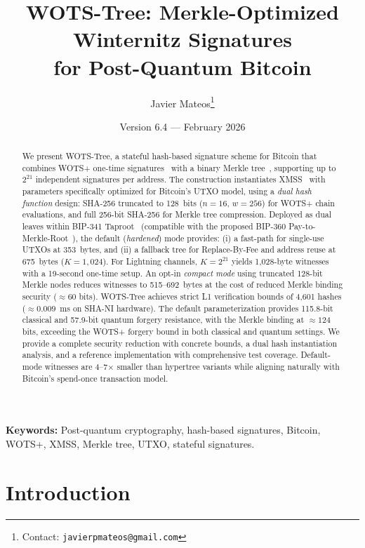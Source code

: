 \documentclass[11pt,a4paper]{article}
\title{\textbf{WOTS-Tree: Merkle-Optimized Winternitz Signatures\\for Post-Quantum Bitcoin}}
\author{Javier Mateos\thanks{Contact: \texttt{javierpmateos@gmail.com}}}
\date{Version 6.4 --- February 2026}
\theoremstyle{definition}
\begin{document}
\maketitle

\begin{abstract}
We present WOTS-Tree, a stateful hash-based signature scheme for Bitcoin that combines WOTS+ one-time signatures~\cite{hulsing2013wots} with a binary Merkle tree~\cite{merkle1989certified}, supporting up to $2^{21}$ independent signatures per address. The construction instantiates XMSS~\cite{buchmann2011xmss,rfc8391} with parameters specifically optimized for Bitcoin's UTXO model, using a \emph{dual hash function} design: SHA-256 truncated to 128~bits ($n=16$, $w=256$) for WOTS+ chain evaluations, and full 256-bit SHA-256 for Merkle tree compression. Deployed as dual leaves within BIP-341 Taproot~\cite{bip341} (compatible with the proposed BIP-360 Pay-to-Merkle-Root~\cite{bip360}), the default (\emph{hardened}) mode provides: (i) a fast-path for single-use UTXOs at 353~bytes, and (ii) a fallback tree for Replace-By-Fee and address reuse at 675~bytes ($K=1{,}024$). For Lightning channels, $K=2^{21}$ yields 1,028-byte witnesses with a 19-second one-time setup. An opt-in \emph{compact mode} using truncated 128-bit Merkle nodes reduces witnesses to 515--692~bytes at the cost of reduced Merkle binding security ($\approx 60$ bits). WOTS-Tree achieves strict L1 verification bounds of 4,601 hashes ($\approx 0.009$~ms on SHA-NI hardware). The default parameterization provides 115.8-bit classical and 57.9-bit quantum forgery resistance, with the Merkle binding at $\approx 124$ bits, exceeding the WOTS+ forgery bound in both classical and quantum settings. We provide a complete security reduction with concrete bounds, a dual hash instantiation analysis, and a reference implementation with comprehensive test coverage. Default-mode witnesses are 4--7$\times$ smaller than hypertree variants while aligning naturally with Bitcoin's spend-once transaction model.
\end{abstract}

\medskip
\noindent\textbf{Keywords:} Post-quantum cryptography, hash-based signatures, Bitcoin, WOTS+, XMSS, Merkle tree, UTXO, stateful signatures.

\section{Introduction}
\label{sec:intro}
\end{document}
